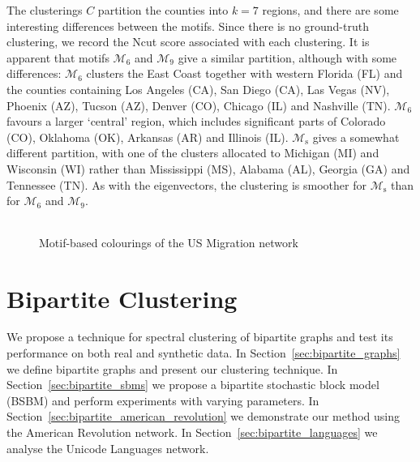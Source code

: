 \documentclass[12pt,draft]{ociamthesis}
\theoremstyle{plain}
\theoremstyle{definition}
\theoremstyle{remark}
\newcommand\ca[1]{\mathcal{#1}}
\begin{document}
The clusterings $C$ partition the counties into $k=7$ regions, and there are
some interesting differences between the motifs.
Since there is no ground-truth clustering, we record the Ncut score associated
with each clustering.
It is apparent that motifs $\ca{M}_6$ and $\ca{M}_9$ give a similar partition,
although with some differences:
$\ca{M}_6$ clusters the East Coast together with western Florida (FL) and the
counties containing Los Angeles (CA), San Diego (CA), Las Vegas (NV), Phoenix
(AZ), Tucson (AZ), Denver (CO), Chicago (IL) and Nashville (TN).
$\ca{M}_6$ favours a larger `central' region, which includes significant parts
of Colorado (CO), Oklahoma (OK), Arkansas (AR) and Illinois (IL).
$\ca{M}_\mathrm{s}$ gives a somewhat different partition, with one of the
clusters allocated to Michigan (MI) and Wisconsin (WI) rather than Mississippi
(MS), Alabama (AL), Georgia (GA) and Tennessee (TN). As with the eigenvectors,
the clustering is smoother for $\ca{M}_\mathrm{s}$ than for $\ca{M}_6$ and
$\ca{M}_9$.

\pagebreak

\vspace*{-1cm}
\begin{figure}[H]
  \begin{table}[H]
    \centering
    \setlength{\tabcolsep}{0em}
    \begin{tabular}{ |c|c|c|c| }
    \end{tabular}
  \end{table}
  \vspace*{-0.5cm}
  \caption{Motif-based colourings of the US Migration network}
  \label{fig:us_migration}
\end{figure}
\clearpage{}
\clearpage{}
\chapter{Bipartite Clustering} \label{chap:bipartite}

We propose a technique for spectral clustering of bipartite graphs and test its
performance on both real and synthetic data.
In Section~\ref{sec:bipartite_graphs} we define bipartite graphs and present
our clustering technique.
In Section~\ref{sec:bipartite_sbms} we propose a bipartite stochastic block
model (BSBM) and perform experiments with varying parameters.
In Section~\ref{sec:bipartite_american_revolution} we demonstrate our method
using the American Revolution network.
In Section~\ref{sec:bipartite_languages} we analyse the Unicode Languages
network.
\end{document}
